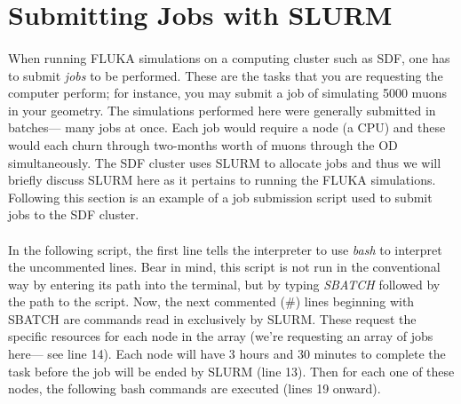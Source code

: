 \section{Submitting Jobs with SLURM}


\paragraph{}
When running FLUKA simulations on a computing cluster such as SDF, one has to submit \textit{jobs} to be performed. These are the tasks that you are requesting the computer perform; for instance, you may submit a job of simulating 5000 muons in your geometry. The simulations performed here were generally submitted in batches— many jobs at once. Each job would require a node (a CPU) and these would each churn through two-months worth of muons through the OD simultaneously.  The SDF cluster uses SLURM to allocate jobs and thus we will briefly discuss SLURM here as it pertains to running the FLUKA simulations. Following this section is an example of a job submission script used to submit jobs to the SDF cluster.

\paragraph{}
In the following script, the first line tells the interpreter to use \textit{bash} to interpret the uncommented lines. Bear in mind, this script is not run in the conventional way by entering its path into the terminal, but by typing \textit{SBATCH} followed by the path to the script. Now, the next commented (\#) lines beginning with SBATCH are commands read in exclusively by SLURM. These request the specific resources for each node in the array (we're requesting an array of jobs here— see line 14). Each node will have 3 hours and 30 minutes to complete the task before the job will be ended by SLURM (line 13). Then for each one of these nodes, the following bash commands are executed (lines 19 onward).

